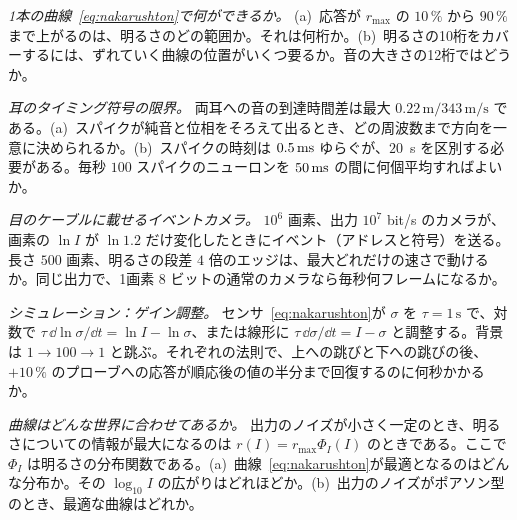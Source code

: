 \begin{exercise}[\lvlB]
\label{ex:11:3}
\emph{1本の曲線~\eqref{eq:nakarushton}で何ができるか。} (a)~応答が $r_{\max}$ の $10\,\%$ から $90\,\%$ まで上がるのは、明るさのどの範囲か。それは何桁か。(b)~明るさの10桁をカバーするには、ずれていく曲線の位置がいくつ要るか。音の大きさの12桁ではどうか。
\end{exercise}

\begin{exercise}[\lvlB]
\label{ex:11:4}
\emph{耳のタイミング符号の限界。} 両耳への音の到達時間差は最大 $0.22\,\text{m}/343\,\text{m/s}$ である。(a)~スパイクが純音と位相をそろえて出るとき、どの周波数まで方向を一意に決められるか。(b)~スパイクの時刻は $0.5\,\text{ms}$ ゆらぐが、$20$~\textmu s を区別する必要がある。毎秒 $100$ スパイクのニューロンを $50\,\text{ms}$ の間に何個平均すればよいか。
\end{exercise}

\begin{exercise}[\lvlB]
\label{ex:11:5}
\emph{目のケーブルに載せるイベントカメラ。} $10^6$ 画素、出力 $10^7$ bit/s のカメラが、画素の $\ln I$ が $\ln1.2$ だけ変化したときにイベント（アドレスと符号）を送る。長さ $500$ 画素、明るさの段差 $4$ 倍のエッジは、最大どれだけの速さで動けるか。同じ出力で、1画素 $8$ ビットの通常のカメラなら毎秒何フレームになるか。
\end{exercise}

\begin{exercise}[\lvlB]
\label{ex:11:6}
\emph{シミュレーション：ゲイン調整。} センサ~\eqref{eq:nakarushton}が $\sigma$ を $\tau=1\,\text{s}$ で、対数で $\tau\,\dd\ln\sigma/\dd t=\ln I-\ln\sigma$、または線形に $\tau\,\dd\sigma/\dd t=I-\sigma$ と調整する。背景は $1\to100\to1$ と跳ぶ。それぞれの法則で、上への跳びと下への跳びの後、$+10\,\%$ のプローブへの応答が順応後の値の半分まで回復するのに何秒かかるか。
\end{exercise}

\begin{exercise}[\lvlC]
\label{ex:11:7}
\emph{曲線はどんな世界に合わせてあるか。} 出力のノイズが小さく一定のとき、明るさについての情報が最大になるのは $r(I)=r_{\max}\Phi_I(I)$ のときである。ここで $\Phi_I$ は明るさの分布関数である。(a)~曲線~\eqref{eq:nakarushton}が最適となるのはどんな分布か。その $\log_{10}I$ の広がりはどれほどか。(b)~出力のノイズがポアソン型のとき、最適な曲線はどれか。
\end{exercise}
